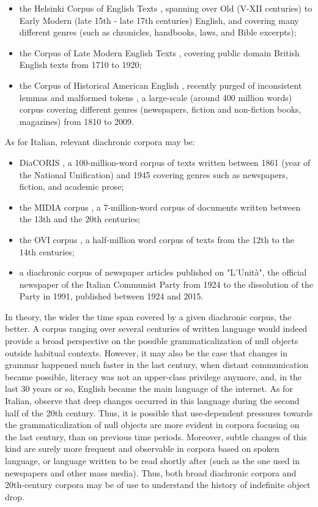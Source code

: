 \begin{itemize}
    \item the Helsinki Corpus of English Texts \parencite{rissanen1993helsinki}, spanning over Old (V-XII centuries) to Early Modern (late 15th - late 17th centuries) English, and covering many different genres (such as chronicles, handbooks, laws, and Bible excerpts);
    \item the Corpus of Late Modern English Texts \parencite{deSmet2005corpus, deSmet2015corpus}, covering public domain British English texts from 1710 to 1920;
    \item the Corpus of Historical American English \parencite{davies2010corpus, davies2012expanding}, recently purged of inconsistent lemmas and malformed tokens \parencite{alatrash2020ccoha}, a large-scale (around 400 million words) corpus covering different genres (newspapers, fiction and non-fiction books, magazines) from 1810 to 2009.
\end{itemize}

As for Italian, relevant diachronic corpora may be:
\begin{itemize}
    \item DiaCORIS \parencite{onelli2006diacoris}, a 100-million-word corpus of texts written between 1861 (year of the National Unification) and 1945 covering genres such as newspapers, fiction, and academic prose;
    \item the MIDIA corpus \parencite{gaeta2013midia, iacobini2014midia}, a 7-million-word corpus of documents written between the 13th and the 20th centuries;
    \item the OVI corpus \parencite{ovi2005corpus}, a half-million word corpus of texts from the 12th to the 14th centuries;
    \item a diachronic corpus of newspaper articles published on "L'Unit\`{a}", the official newspaper of the Italian Communist Party from 1924 to the dissolution of the Party in 1991, published between 1924 and 2015.
\end{itemize}

In theory, the wider the time span covered by a given diachronic corpus, the better. A corpus ranging over several centuries of written language would indeed provide a broad perspective on the possible grammaticalization of null objects outside habitual contexts. However, it may also be the case that changes in grammar happened much faster in the last century, when distant communication became possible, literacy was not an upper-class privilege anymore, and, in the last 30 years or so, English became the main language of the internet. As for Italian, \textcite{basile2020diachronic} observe that deep changes occurred in this language during the second half of the 20th century. Thus, it is possible that use-dependent pressures towards the grammaticalization of null objects are more evident in corpora focusing on the last century, than on previous time periods. Moreover, subtle changes of this kind are surely more frequent and observable in corpora based on spoken language, or language written to be read shortly after (such as the one used in newspapers and other mass media). Thus, both broad diachronic corpora and 20th-century corpora may be of use to understand the history of indefinite object drop.

